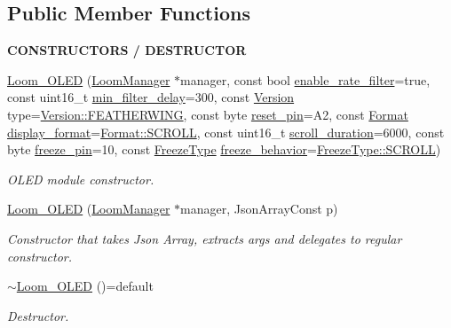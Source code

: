 \subsection*{Public Member Functions}
\begin{Indent}{\bf C\+O\+N\+S\+T\+R\+U\+C\+T\+O\+RS / D\+E\+S\+T\+R\+U\+C\+T\+OR}\par
\begin{DoxyCompactItemize}
\item 
\hyperlink{class_loom___o_l_e_d_accc63c1437c4d67fa6efbac79d647996}{Loom\+\_\+\+O\+L\+ED} (\hyperlink{class_loom_manager}{Loom\+Manager} $\ast$manager, const bool \hyperlink{class_loom_log_plat_a6d343b76b79a1e51572bcf2991966e61}{enable\+\_\+rate\+\_\+filter}=true, const uint16\+\_\+t \hyperlink{class_loom_log_plat_a3d4ffe4204560b9677b8007be7f522be}{min\+\_\+filter\+\_\+delay}=300, const \hyperlink{class_loom___o_l_e_d_aaf40c7e29901e7130f86046a26cb7400}{Version} type=\hyperlink{class_loom___o_l_e_d_aaf40c7e29901e7130f86046a26cb7400a012f86b3ded09f31189cefd9fe361d97}{Version\+::\+F\+E\+A\+T\+H\+E\+R\+W\+I\+NG}, const byte \hyperlink{class_loom___o_l_e_d_a8962f61e0211d70d1d1de489d1d6bbfa}{reset\+\_\+pin}=A2, const \hyperlink{class_loom___o_l_e_d_aade282dab7eb118271f73b3b3bfc0ffd}{Format} \hyperlink{class_loom___o_l_e_d_a1cfdc8965297ea1f697d8a4d3e44b5fd}{display\+\_\+format}=\hyperlink{class_loom___o_l_e_d_aade282dab7eb118271f73b3b3bfc0ffda71574275cadb387a5082e87e9dd60c25}{Format\+::\+S\+C\+R\+O\+LL}, const uint16\+\_\+t \hyperlink{class_loom___o_l_e_d_ad6893fc088b080440f2f1d5d6f84d461}{scroll\+\_\+duration}=6000, const byte \hyperlink{class_loom___o_l_e_d_a693dc20156729cb7d06e877247e914d0}{freeze\+\_\+pin}=10, const \hyperlink{class_loom___o_l_e_d_adedc20c1c901fe472d976c722abf0bb9}{Freeze\+Type} \hyperlink{class_loom___o_l_e_d_aafea3f7f393170a4cc7c5e7ff8583344}{freeze\+\_\+behavior}=\hyperlink{class_loom___o_l_e_d_adedc20c1c901fe472d976c722abf0bb9a71574275cadb387a5082e87e9dd60c25}{Freeze\+Type\+::\+S\+C\+R\+O\+LL})
\begin{DoxyCompactList}\small\item\em O\+L\+ED module constructor. \end{DoxyCompactList}\item 
\hyperlink{class_loom___o_l_e_d_abbe56d7e45b4de6ae1ae1296c074d448}{Loom\+\_\+\+O\+L\+ED} (\hyperlink{class_loom_manager}{Loom\+Manager} $\ast$manager, Json\+Array\+Const p)
\begin{DoxyCompactList}\small\item\em Constructor that takes Json Array, extracts args and delegates to regular constructor. \end{DoxyCompactList}\item 
\hyperlink{class_loom___o_l_e_d_a6970e6d9fa0dd9b40e87cb4f59a01a3f}{$\sim$\+Loom\+\_\+\+O\+L\+ED} ()=default
\begin{DoxyCompactList}\small\item\em Destructor. \end{DoxyCompactList}\end{DoxyCompactItemize}
\end{Indent}
